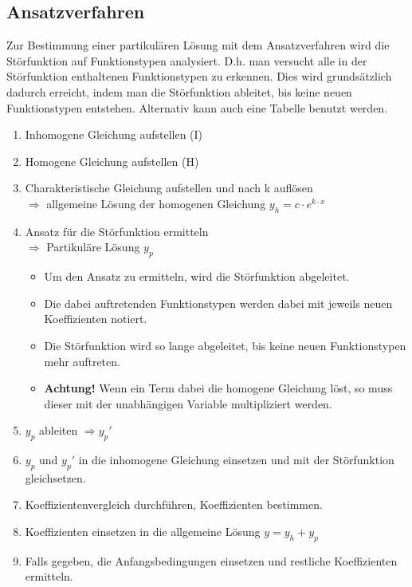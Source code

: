 \subsection{Ansatzverfahren}
Zur Bestimmung einer partikulären Lösung mit dem Ansatzverfahren wird die 
Störfunktion auf Funktionstypen analysiert. D.h. man versucht alle in der
Störfunktion enthaltenen Funktionstypen zu erkennen. Dies wird grundsätzlich
dadurch erreicht, indem man die Störfunktion ableitet, bis keine neuen 
Funktionstypen entstehen. Alternativ kann auch eine Tabelle benutzt werden.

\begin{enumerate}
	\item Inhomogene Gleichung aufstellen (I)
	\item Homogene Gleichung aufstellen (H)
	\item Charakteristische Gleichung aufstellen und nach k auflösen\\
		  $\Rightarrow$ allgemeine Lösung der homogenen Gleichung 
		  $y_h = c\cdot e^{k\cdot x}$
	\item Ansatz für die Störfunktion ermitteln \\
		  $\Rightarrow$ Partikuläre Lösung $y_p$ 
          \begin{itemize}
              \item Um den Ansatz zu ermitteln, wird die Störfunktion 
                    abgeleitet. 
              \item Die dabei auftretenden Funktionstypen werden dabei mit 
                    jeweils neuen Koeffizienten notiert. 
              \item Die Störfunktion wird so lange abgeleitet, bis keine neuen 
                    Funktionstypen mehr auftreten. 
              \item \textbf{Achtung!} Wenn ein Term dabei die homogene 
                    Gleichung löst, so muss dieser mit der unabhängigen 
                    Variable multipliziert werden. 
          \end{itemize}
	\item $y_p$ ableiten $\Rightarrow y_p'$
	\item $y_p$ und $y_p'$ in die inhomogene Gleichung einsetzen
		  und mit der Störfunktion gleichsetzen.
	\item Koeffizientenvergleich durchführen, Koeffizienten bestimmen.
	\item Koeffizienten einsetzen in die allgemeine Lösung $y=y_h + y_p$
	\item Falls gegeben, die Anfangsbedingungen einsetzen und restliche 
		  Koeffizienten ermitteln.
\end{enumerate}

